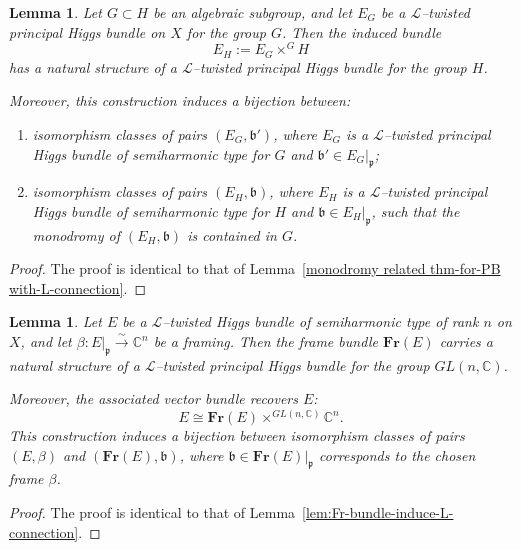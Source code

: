 \documentclass[12pt,reqno]{amsart}
\numberwithin{equation}{subsection}
\newtheorem{lem}[equation]{Lemma}
\theoremstyle{definition}
\theoremstyle{theorem}
\begin{document}
\begin{lem}\label{monodromy related thm- with-L-twisted-Higgs-bundle-for-PB}
	Let $G \subset H$ be an algebraic subgroup, and let
	$E_G$ be a $\mathcal{L}$--twisted principal Higgs bundle on $X$ for the
	group $G$.
	Then the induced bundle
	\[
	E_H := E_G \times^{G} H
	\]
	has a natural structure of a $\mathcal{L}$--twisted principal Higgs
	bundle for the group $H$.
	
	Moreover, this construction induces a bijection between:
	\begin{enumerate}
		\item
		isomorphism classes of pairs $(E_G,\mathfrak{b}')$, where $E_G$ is a
		$\mathcal{L}$--twisted principal Higgs bundle of semiharmonic type for
		$G$ and $\mathfrak{b}' \in E_G|_{\mathfrak{p}}$;
		
		\item
		isomorphism classes of pairs $(E_H,\mathfrak{b})$, where $E_H$ is a
		$\mathcal{L}$--twisted principal Higgs bundle of semiharmonic type for
		$H$ and $\mathfrak{b} \in E_H|_{\mathfrak{p}}$, such that the monodromy of
		$(E_H,\mathfrak{b})$ is contained in $G$.
	\end{enumerate}
\end{lem}

\begin{proof}
	The proof is identical to that of
	Lemma~\eqref{monodromy related thm-for-PB with-L-connection}.
\end{proof}

\begin{lem}\label{lem:Fr-bundle as - L-twisted-principal-GLn - bundle}
	Let $E$ be a $\mathcal{L}$--twisted Higgs bundle of semiharmonic type of
	rank $n$ on $X$, and let
	$\beta \colon E|_{\mathfrak{p}} \xrightarrow{\sim} \mathbb{C}^{n}$ be a
	framing.
	Then the frame bundle $\mathbf{Fr}(E)$ carries a natural structure of a
	$\mathcal{L}$--twisted principal Higgs bundle for the group
	$GL(n,\mathbb{C})$.
	
	Moreover, the associated vector bundle recovers $E$:
	\[
	E \cong \mathbf{Fr}(E) \times^{GL(n,\mathbb{C})} \mathbb{C}^{n}.
	\]
	This construction induces a bijection between isomorphism classes of
	pairs $(E,\beta)$ and $(\mathbf{Fr}(E),\mathfrak{b})$, where
	$\mathfrak{b} \in \mathbf{Fr}(E)|_{\mathfrak{p}}$ corresponds to the
	chosen frame $\beta$.
\end{lem}

\begin{proof}
	The proof is identical to that of
	Lemma~\eqref{lem:Fr-bundle-induce-L-connection}.
\end{proof}
\end{document}
